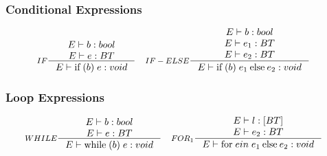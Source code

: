 \subsubsection{Conditional Expressions}
\begin{align*}
&\inference[$IF$]{E \vdash b : bool \\
                  E \vdash e : BT}
                 {E \vdash \mathbin{\textrm{if}} \; (b) \; {e}: void}
&
&\inference[$IF-ELSE$]{E \vdash b : bool \\
                  E \vdash e_1 : BT \\
                  E \vdash e_2 : BT}
                 {E \vdash \mathbin{\textrm{if}} \; (b) \; {e_1} \mathbin{\textrm{else}} {e_2}: void}
\end{align*}

\subsubsection{Loop Expressions}
\begin{align*}
&\inference[$WHILE$]{E \vdash b : bool \\
                  E \vdash e : BT}
                 {E \vdash \mathbin{\textrm{while}} \; (b) \; {e}: void}
&
&\inference[$FOR_1$]{E \vdash l : [BT] \\
                  E \vdash e_2 : BT}
                 {E \vdash \mathbin{\textrm{for}} \; e in \; {e_1} \mathbin{\textrm{else}} {e_2}: void}
\end{align*}